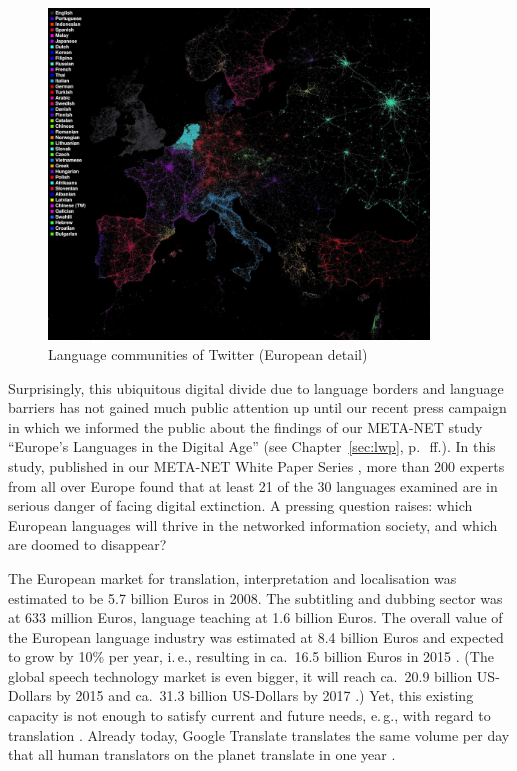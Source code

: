 \documentclass[10pt, plain]{../../metanetpaper}
\begin{document}
\begin{multicols}{2}
\begin{figure}[htb]
  \center
  \includegraphics[width=0.9\textwidth]{../_media/twitter-languages-europe}
  \caption{Language communities of Twitter (European detail) \cite{fisher11}}
  \label{fig:european-languages-in-twitter}
\end{figure}

Surprisingly, this ubiquitous digital divide due to language borders and language barriers has not gained much public attention up until our recent press campaign in which we informed the public about the findings of our META-NET study ``Europe's Languages in the Digital Age'' (see Chapter~\ref{sec:lwp}, p.~\pageref{sec:lwp}\,ff.). In this study, published in our META-NET White Paper Series \cite{LWP2012}, more than 200 experts from all over Europe found that at least 21 of the 30 languages examined are in serious danger of facing digital extinction. A pressing question raises: which European languages will thrive in the networked information society, and which are doomed to disappear?

The European market for translation, interpretation and localisation was estimated to be 5.7 billion Euros in 2008. The subtitling and dubbing sector was at 633 million Euros, language teaching at 1.6 billion Euros. The overall value of the European language industry was estimated at 8.4 billion Euros and expected to grow by 10\% per year, i.\,e., resulting in ca.~16.5 billion Euros in 2015 \cite{EC3, EC6}. (The global speech technology market is even bigger, it will reach ca.~20.9 billion US-Dollars by 2015 and ca.~31.3 billion US-Dollars by 2017 \cite{gia2012}.) Yet, this existing capacity is not enough to satisfy current and future needs, e.\,g., with regard to translation \cite{csa2009}. Already today, Google Translate translates the same volume per day that all human translators on the planet translate in one year \cite{och12}.


\end{multicols}
\end{document}
